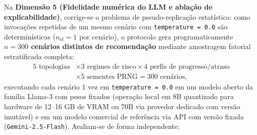 \documentclass[12pt,openany,oneside,a4paper,english,brazilian,sumario=tradicional]{abntex2}
\begin{document}
Na \textbf{Dimensão 5 (Fidelidade numérica do LLM e ablação de explicabilidade)}, corrige-se o problema de pseudo-replicação estatística: como invocações repetidas de um mesmo cenário com \texttt{temperature = 0.0} são determinísticas ($n_{\mathrm{ef}}=1$ por cenário), o protocolo gera programaticamente \textbf{$n=300$ cenários distintos de recomendação} mediante amostragem fatorial estratificada completa:
\begin{equation}
\begin{aligned}
5\text{ topologias} &\times 3\text{ regimes de risco} \times 4\text{ perfis de progresso/atraso} \\
&\times 5\text{ sementes PRNG} = 300\text{ cenários},
\end{aligned}
\end{equation}
executando cada cenário 1 vez em \texttt{temperature = 0.0} em um modelo aberto da família Llama-3 com pesos fixados (operação local em 8B quantizado para hardware de 12--16 GB de VRAM ou 70B via provedor dedicado com versão imutável) e em um modelo comercial de referência via API com versão fixada (\texttt{Gemini-2.5-Flash}). Avaliam-se de forma independente:
\end{document}
